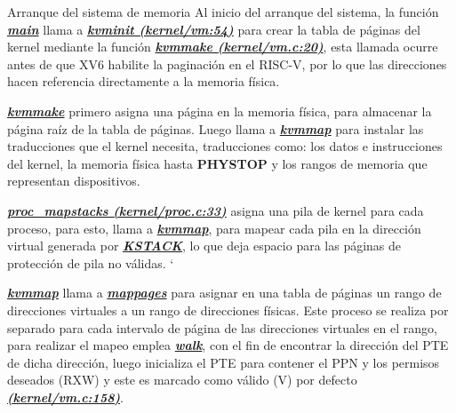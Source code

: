 \documentclass{libs/ufc_format}
\begin{document}
\begin{frame}{Arranque del sistema de memoria}
  Al inicio del arranque del sistema, la función \href{https://github.com/CarlosSandoval-03/xv6-riscv/blob/riscv/kernel/main.c\#L20}{\textbf{\textit{main}}} llama a \href{https://github.com/CarlosSandoval-03/xv6-riscv/blob/riscv/kernel/vm.c\#L54}{\textbf{\textit{kvminit (kernel/vm:54)}}} para crear la tabla de páginas del kernel mediante la función \href{https://github.com/CarlosSandoval-03/xv6-riscv/blob/riscv/kernel/vm.c\#L20}{\textbf{\textit{kvmmake (kernel/vm.c:20)}}}, esta llamada ocurre antes de que XV6 habilite la paginación en el RISC-V, por lo que las direcciones hacen referencia directamente a la memoria física.

  \vspace{0.3cm}

  \href{https://github.com/CarlosSandoval-03/xv6-riscv/blob/riscv/kernel/vm.c\#L20}{\textbf{\textit{kvmmake}}} primero asigna una página en la memoria física, para almacenar la página raíz de la tabla de páginas. Luego llama a \href{https://github.com/CarlosSandoval-03/xv6-riscv/blob/riscv/kernel/vm.c\#L132}{\textbf{\textit{kvmmap}}} para instalar las traducciones que el kernel necesita, traducciones como: los datos e instrucciones del kernel, la memoria física hasta \textbf{PHYSTOP} y los rangos de memoria que representan dispositivos. \cite{xv6_book} \cite{xv6}
\end{frame}
\begin{frame}{}
  \href{https://github.com/CarlosSandoval-03/xv6-riscv/blob/riscv/kernel/proc.c\#L33}{\textbf{\textit{proc\_mapstacks (kernel/proc.c:33)}}} asigna una pila de kernel para cada proceso, para esto, llama a \href{https://github.com/CarlosSandoval-03/xv6-riscv/blob/riscv/kernel/vm.c\#L132}{\textbf{\textit{kvmmap}}}, para mapear cada pila en la dirección virtual generada por \href{https://github.com/CarlosSandoval-03/xv6-riscv/blob/riscv/kernel/memlayout.h\#L56}{\textbf{\textit{KSTACK}}}, lo que deja espacio para las páginas de protección de pila no válidas.
  `
  \vspace{0.3cm}

  \href{https://github.com/CarlosSandoval-03/xv6-riscv/blob/riscv/kernel/vm.c\#L132}{\textbf{\textit{kvmmap}}} llama a \href{https://github.com/CarlosSandoval-03/xv6-riscv/blob/riscv/kernel/vm.c\#L143}{\textbf{\textit{mappages}}} para asignar en una tabla de páginas un rango de direcciones virtuales a un rango de direcciones físicas. Este proceso se realiza por separado para cada intervalo de página de las direcciones virtuales en el rango, para realizar el mapeo emplea \href{https://github.com/CarlosSandoval-03/xv6-riscv/blob/riscv/kernel/vm.c\#L86}{\textbf{\textit{walk}}}, con el fin de encontrar la dirección del PTE de dicha dirección, luego inicializa el PTE para contener el PPN y los permisos deseados (RXW) y este es marcado como válido (V) por defecto \href{https://github.com/CarlosSandoval-03/xv6-riscv/blob/riscv/kernel/vm.c\#L158}{\textbf{\textit{(kernel/vm.c:158)}}}. \cite{xv6_book} \cite{xv6}
\end{frame}
\end{document}
